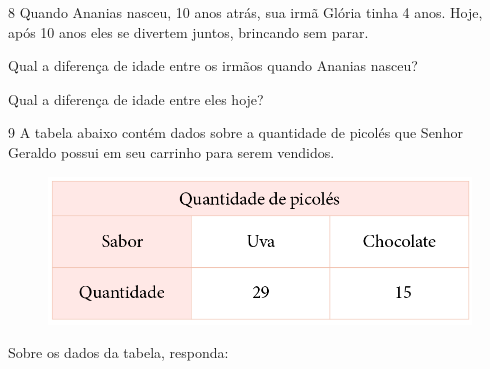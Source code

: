 \num{8} Quando Ananias nasceu, 10 anos atrás, sua irmã Glória tinha 4 
anos. Hoje, após 10 anos eles se divertem juntos, brincando sem parar.

\begin{escolha}
\item
  Qual a diferença de idade entre os irmãos quando Ananias nasceu?

\begin{emptybox}
\bigskip
\bigskip
\bigskip
\end{emptybox}

\item
  Qual a diferença de idade entre eles hoje?

\begin{emptybox}
\end{emptybox}
\end{escolha}


\num{9} A tabela abaixo contém dados sobre a quantidade de picolés que
Senhor Geraldo possui em seu carrinho para serem vendidos.

\begin{figure}[htpb!]
\centering
\includegraphics[width=.7\textwidth]{../ilustracoes/MAT5/SAEB_5ANO_MAT_figura92.png}
\end{figure}


\pagebreak
Sobre os dados da tabela, responda:

